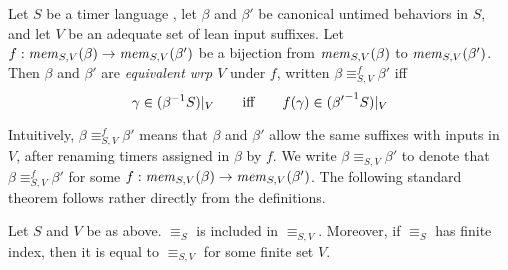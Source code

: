 \begin{definition}
  \label{def:approx-nerode}
Let $S$ be a timer language ,
let $\beta$ and $\beta'$ be canonical untimed behaviors in $S$,
and let  $V$ be an adequate set of lean input suffixes.
Let $f : \apprgetmemorable{S}{\beta}{V} \to \apprgetmemorable{S}{\beta'}{V}$
be a bijection
from $\apprgetmemorable{S}{\beta}{V}$ to $\apprgetmemorable{S}{\beta'}{V}$.
Then $\beta$ and $\beta'$ are \emph{equivalent wrp $V$} under $f$, written
$\beta \equiv_{S,V}^f \beta'$ iff
\[
\gamma \in \apprsuffixbehs{S}{\beta}{V}
\qquad \mbox{iff} \qquad
f(\gamma) \in \apprsuffixbehs{S}{\beta'}{V}
\]
\end{definition}
Intuitively, $\beta \equiv_{S,V}^f \beta'$ means that $\beta$ and $\beta'$
allow the same suffixes with inputs in $V$, after renaming
timers assigned in $\beta$ by $f$.
We write $\beta \equiv_{S,V} \beta'$ to denote that
$\beta \equiv_{S,V}^f \beta'$ for some
$f : \apprgetmemorable{S}{\beta}{V} \to \apprgetmemorable{S}{\beta'}{V}$.
The following standard theorem follows rather directly from the definitions.

\begin{theorem}
  \label{thm:approx-nerode}
Let $S$ and $V$ be as above.
$\equiv_{S}$ is included in $\equiv_{S,V}$. Moreover,
if $\equiv_{S}$ has finite index, then it is equal to
$\equiv_{S,V}$ for some finite set $V$.
\end{theorem}





